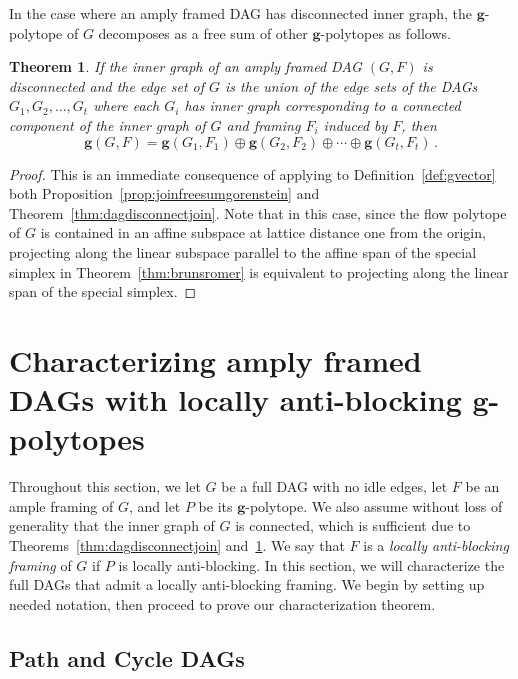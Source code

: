 \documentclass[12pt]{amsart}
\newtheorem{theorem}{Theorem}[section]
\theoremstyle{definition}
\newcommand{\defn}[1]{\emph{\color{blue} #1}}
\newcommand\bg{\mathbf{g}}
\begin{document}
In the case where an amply framed DAG has disconnected inner graph, the $\bg$-polytope of $G$ decomposes as a free sum of other $\bg$-polytopes as follows.

\begin{theorem}\label{thm:dagdisjointgfreesum}
       If the inner graph of an amply framed DAG $(G,F)$ is disconnected and the edge set of $G$ is the union of the edge sets of the DAGs $G_1, G_2, \ldots, G_t$ where each $G_i$ has inner graph corresponding to a connected component of the inner graph of $G$ and framing $F_i$ induced by $F$, then 
    \[
\bg(G,F) = \bg(G_1,F_1)\oplus \bg(G_2,F_2)\oplus \cdots \oplus \bg(G_t,F_t) \, .
    \]
\end{theorem}

\begin{proof}
    This is an immediate consequence of applying to Definition~\ref{def:gvector} both Proposition~\ref{prop:joinfreesumgorenstein} and Theorem~\ref{thm:dagdisconnectjoin}.
    Note that in this case, since the flow polytope of $G$ is contained in an affine subspace at lattice distance one from the origin, projecting along the linear subspace parallel to the affine span of the special simplex in Theorem~\ref{thm:brunsromer} is equivalent to projecting along the linear span of the special simplex.
\end{proof}


\section{Characterizing amply framed DAGs with locally anti-blocking \texorpdfstring{$\bg$}{g}-polytopes}\label{sec:labdags}

Throughout this section, we let $G$ be a full DAG with no idle edges, let $F$ be an ample framing of $G$, and let $P$ be its $\bg$-polytope. 
We also assume without loss of generality that the inner graph of $G$ is connected, which is sufficient due to Theorems~\ref{thm:dagdisconnectjoin} and~\ref{thm:dagdisjointgfreesum}.
We say that $F$ is a \defn{locally anti-blocking framing} of $G$ if $P$ is locally anti-blocking.
In this section, we will characterize the full DAGs that admit a locally anti-blocking framing.
We begin by setting up needed notation, then proceed to prove our characterization theorem.

\subsection{Path and Cycle DAGs}\label{sec:pathcycledags}
\end{document}
